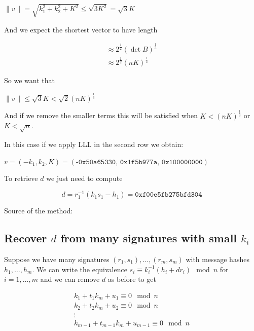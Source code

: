 \documentclass[a4paper,12pt]{report}
\begin{document}
\begin{center}
    $\lVert v \rVert = \sqrt{k_1^2 + k_2^2 + K^2} \le \sqrt{3K^2} = \sqrt{3}K $
\end{center}

And we expect the shortest vector to have length

\[
    \begin{array}{c}
        \approx 2^{\frac{1}{2}}(\det B)^{\frac{1}{3}} \\
        \approx 2^{\frac{1}{2}}(nK)^{\frac{1}{3}}
    \end{array}
\]

So we want that 

\begin{center}
    $\lVert v \rVert \le \sqrt{3}K < \sqrt{2}(nK)^{\frac{1}{3}}$
\end{center}

And if we remove the smaller terms this will be satisfied when $K < (nK)^{\frac{1}{3}}$ or $K < \sqrt{n}$.

In this case if we apply LLL in the second row we obtain:

\begin{center}
    $v = (-k_1, k_2, K) = (\texttt{-0x50a65330, 0x1f5b977a, 0x100000000})$
\end{center}

To retrieve $d$ we just need to compute 

\[
    d = r_1^{-1}(k_1s_1 - h_1) = \texttt{0xf00e5fb275bfd304}
\]

Source of the method:


\subsection{Recover $d$ from many signatures with small $k_i$}

Suppose we have many signatures $(r_1, s_1), \ldots, (r_m, s_m)$ with message hashes $h_1, \ldots, h_m$. We can write the equivalence
$s_i \equiv k_i^{-1}(h_i +  dr_i) \mod n$ for $i = 1,\ldots,m$ and we can remove $d$ as before to get

\[
\begin{array}{c}
    k_1 + t_1k_m + u_1 \equiv 0 \mod n \\
    k_2 + t_2k_m + u_2 \equiv 0 \mod n \\
    \vdots \\
    k_{m-1} + t_{m-1}k_m + u_{m-1} \equiv 0 \mod n
\end{array}
\]
\end{document}
